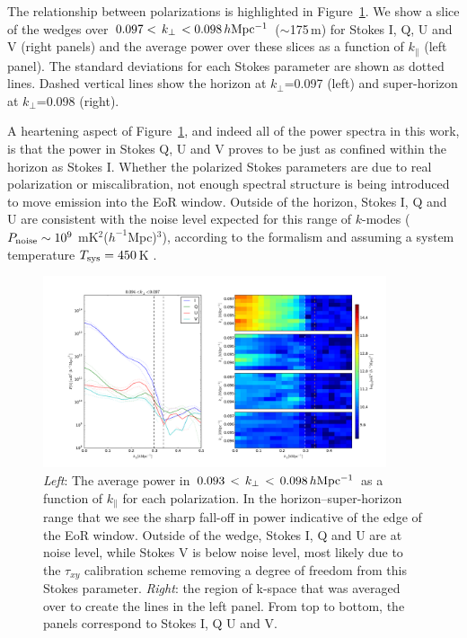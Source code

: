The relationship between polarizations is highlighted in Figure~\ref{fig:psa32_high_kperp_slice}.
We show a slice of the wedges over $0.097<\,k_{\perp}\,<0.098\,h{\rm Mpc^{-1}}$ ($\sim$175\,m) for Stokes I, Q, U and V (right panels) and the average power over these slices as a function of $k_{\parallel}$ (left panel). The standard deviations for each Stokes parameter are shown as dotted lines. 
Dashed vertical lines show the horizon at $k_{\perp}$=0.097 (left) and super-horizon at $k_{\perp}$=0.098 (right).

A heartening aspect of Figure~\ref{fig:psa32_high_kperp_slice}, and indeed all of the power spectra in this work, is that the power in Stokes Q, U and V proves to be just as confined within the horizon as Stokes I. Whether the polarized Stokes parameters are due to real polarization or miscalibration, not enough spectral structure is being introduced to move emission into the EoR window. Outside of the horizon, Stokes I, Q and U are consistent with the noise level expected for this range of $k$-modes ($P_{\rm noise}\sim10^{9}$ mK$^2$($h^{-1}$Mpc)$^3$), according to the formalism \citet{Parsons.12b} and assuming a system temperature $T_{\rm sys}=450\,$K \citep[e.g.][]{Moore.17}.

\begin{figure}[h!]
\centering
\includegraphics[width=0.9\textwidth]{chapters/eor_window_PAPER/figures/high_kperp_with_imshow_errorbars_title.pdf}
\caption[Average power in $0.093\,<\,k_{\perp}\,<\,0.098\,h{\rm Mpc^{-1}}$ as a function of $k_{\parallel}$ for each polarization of PAPER-32 data.]{\textit{Left}: The average power in $0.093\,<\,k_{\perp}\,<\,0.098\,h{\rm Mpc^{-1}}$ as a function of $k_{\parallel}$ for each polarization.  In the horizon--super-horizon range that we see the sharp fall-off in power indicative of the edge of the EoR window. 
Outside of the wedge, Stokes I, Q and U are at noise level, while Stokes V is below noise level, most likely due to the $\tau_{xy}$ calibration scheme removing a degree of freedom from this Stokes parameter. \textit{Right}: the region of k-space that was averaged over to create the lines in the left panel. From top to bottom, the panels correspond to Stokes I, Q U and V.}
\label{fig:psa32_high_kperp_slice}
\end{figure}

